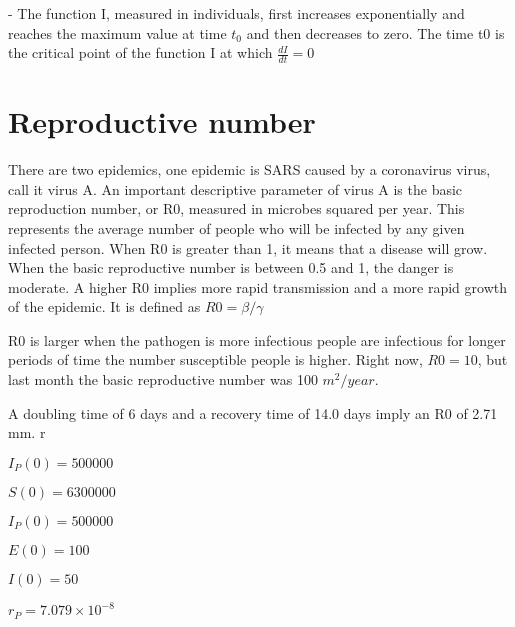 \documentclass{bmcart}
\begin{document}
- The function I, measured in individuals, first increases exponentially and reaches
the maximum value at time $t_{0}$ and then decreases to zero.
The time t0 is the critical point of the function I at which \begin{math}{\frac{dI}{dt} = 0}\end{math}




\section{Reproductive number}

There are two epidemics, one
epidemic is SARS caused by a coronavirus virus, call it
virus A.
An important descriptive parameter of virus A is the basic reproduction number, or R0, measured in microbes squared per year. This represents the average number of people who will be infected by any given infected person. When R0 is greater than 1, it means that a disease will grow. When the basic reproductive number is between 0.5 and 1, the danger is moderate. A higher R0 implies more rapid transmission and a more rapid growth of the epidemic. It is defined as \begin{math}R0 = \beta/ \gamma\end{math}

R0 is larger when the pathogen is more infectious people are infectious for longer periods of time the number susceptible people is higher. Right now, $R0=10$, but last month the basic reproductive number was 100 $m^2/year$.

A doubling time of 6 days and a recovery time of 14.0 days imply an R0 of 2.71 mm. r

\begin{math}
I_P (0) = 500000
\end{math}

\begin{math}
S(0) = 6300000
\end{math}

\begin{math}
I_P (0) = 500000
\end{math}

\begin{math}
E(0) = 100
\end{math}

\begin{math}
I(0) = 50
\end{math}

\begin{math}
r_P = 7.079 \times 10^{-8}
\end{math}
\end{document}
